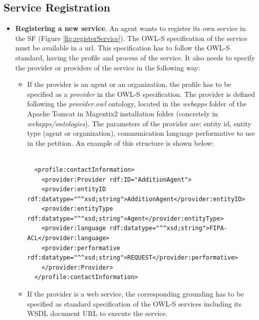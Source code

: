



\subsection{Service Registration}

\begin{itemize}
\item \textbf{Registering a new service}. An agent wants to register its own service in the SF (Figure \ref{fig:registerService}). The OWL-S specification of the service must be available in a url. This specification has to follow the OWL-S standard, having the profile and process of the service. It also needs to specify the provider or providers of the service in the following way:
\begin{itemize}
 \item If the provider is an agent or an organization,  the profile  has to be specified   as a \textit{provider} in the OWL-S specification. The provider is defined following the \textit{provider.owl} ontology, located in the \textit{webapps} folder of the Apache Tomcat in Magentix2 installation folder (concretely in \textit{webapps/ontologies}). The parameters of the provider are: entity id, entity type (agent or organization), communication language performative to use in the petition. An example of this structure is shown below:

 \begin{lstlisting}

  <profile:contactInformation>
    <provider:Provider rdf:ID="AdditionAgent">
	<provider:entityID rdf:datatype="^^xsd;string">AdditionAgent</provider:entityID>
	<provider:entityType rdf:datatype="^^xsd;string">Agent</provider:entityType>
	<provider:language rdf:datatype="^^xsd;string">FIPA-ACL</provider:language>
	<provider:performative rdf:datatype="^^xsd;string">REQUEST</provider:performative>
    </provider:Provider>
  </profile:contactInformation>

 \end{lstlisting}

 \item If the provider is a web service,  the corresponding grounding has to be specified  as standard specification of the OWL-S services including its WSDL document URL to execute the service.


\end{itemize}
\end{itemize}
